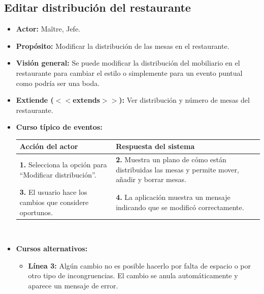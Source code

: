 \documentclass[spanish,a4paper,11pt, twoside]{report}	%
\begin{document}

		\subsection{Editar distribución del restaurante}
			\begin{itemize}
			\item \textbf{Actor:} Maître, Jefe.
			\item \textbf{Propósito:} Modificar la distribución de las mesas en el restaurante.
			\item \textbf{Visión general:} Se puede modificar la distribución del mobiliario
				en el restaurante para cambiar el estilo o simplemente para un evento puntual
				como podría ser una boda.
			\item \textbf{Extiende ($<<$extends$>>$):} Ver distribución y número de mesas del restaurante.
			\item \textbf{Curso típico de eventos:} 	\\
			\begin{tabular}{|p{6cm}||p{6cm}|}
				\hline
				\textbf{Acción del actor} & \textbf{Respuesta del sistema} \\ \hline \hline
				\textbf{1.} Selecciona la opción para ``Modificar distribución''. & 
				\textbf{2.} Muestra un plano de cómo están distribuidas las mesas y permite mover, añadir y borrar mesas. \\ \hline
				\textbf{3.} El usuario hace los cambios que considere oportunos.	& 
				\textbf{4.} La aplicación muestra un mensaje indicando que se modificó correctamente. \\ \hline
			\end{tabular}
			\\
			\item \textbf{Cursos alternativos:} 
			\begin{itemize}
				\item  \textbf{Línea 3:} Algún cambio no es posible hacerlo por falta de espacio
					o por otro tipo de incongruencias. El cambio se anula automáticamente y aparece
					un mensaje de error.
			\end {itemize}
		\end {itemize}

\end{document}
